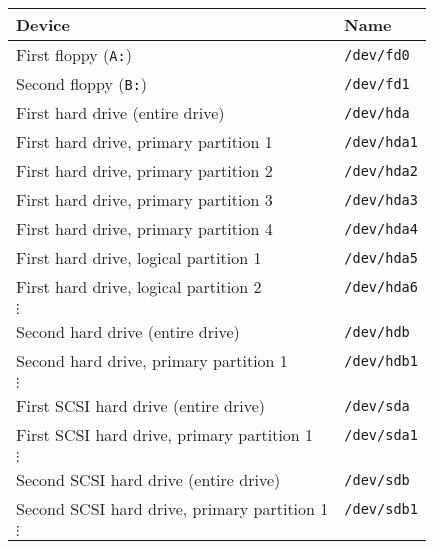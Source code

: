 {\newpage
\clearpage
\samepage {}
}

{\newpage
\clearpage
\samepage {}
}

{\newpage
\clearpage
\samepage {}
}

{\newpage
\clearpage
\samepage \begin{table}[ht]\begin{center}
\small\begin{tabular}{ll}
\hline 
Device                                   & Name \\  
\hline 
First floppy ({\tt A:})                  & {\tt /dev/fd0}  \\ 
Second floppy ({\tt B:})                 & {\tt /dev/fd1}  \\ 
First hard drive (entire drive)          & {\tt /dev/hda}  \\ 
First hard drive, primary partition 1    & {\tt /dev/hda1} \\ 
First hard drive, primary partition 2    & {\tt /dev/hda2} \\ 
First hard drive, primary partition 3    & {\tt /dev/hda3} \\ 
First hard drive, primary partition 4    & {\tt /dev/hda4} \\ 
First hard drive, logical partition 1    & {\tt /dev/hda5} \\ 
First hard drive, logical partition 2    & {\tt /dev/hda6} \\ 
$\vdots$ & \\ 
Second hard drive (entire drive)         & {\tt /dev/hdb} \\ 
Second hard drive, primary partition 1   & {\tt /dev/hdb1} \\ 
$\vdots$ & \\ 
First SCSI hard drive (entire drive)     & {\tt /dev/sda} \\ 
First SCSI hard drive, primary partition 1 & {\tt /dev/sda1} \\ 
$\vdots$ & \\ 
Second SCSI hard drive (entire drive)    & {\tt /dev/sdb} \\ 
Second SCSI hard drive, primary partition 1 & {\tt /dev/sdb1} \\ 
$\vdots$ & 
\end{tabular}\normalsize\rm

\label{table-part-names}
\end{center}\end{table}
}

